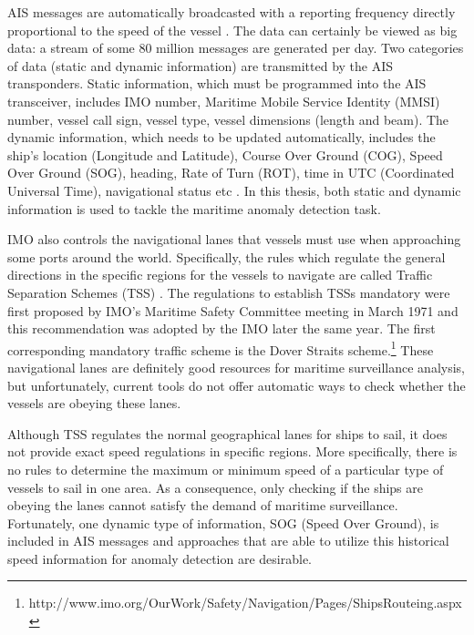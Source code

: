 \documentclass[12pt,glossary]{dalcsthesis}
\begin{document}
AIS messages are automatically broadcasted with a reporting frequency directly proportional to the speed of the vessel \cite{kde}.  The data can certainly be viewed as big data: a stream of some 80 million messages are generated per day. Two categories of data (static and dynamic information) are transmitted by the AIS transponders. Static information, which must be programmed into the AIS transceiver,  includes IMO number, Maritime Mobile Service Identity (MMSI) number, vessel call sign, vessel type, vessel dimensions (length and beam). The dynamic information, which needs to be updated automatically, includes the ship's location (Longitude and Latitude), Course Over Ground (COG), Speed Over Ground (SOG), heading, Rate of Turn (ROT), time in UTC (Coordinated Universal Time), navigational status etc \cite{IALA}. In this thesis, both static and dynamic information is used to tackle the maritime anomaly detection task.


IMO also controls the navigational lanes that vessels must use when approaching some ports around the world. Specifically, the rules which regulate the general directions in the specific regions for the vessels to navigate are called Traffic Separation Schemes (TSS) \cite{tss}.  The regulations to establish TSSs mandatory were first proposed by IMO's Maritime Safety Committee meeting in March 1971 and this recommendation was adopted by the IMO later the same year. The first corresponding mandatory traffic scheme is the Dover Straits scheme.\footnote{http://www.imo.org/OurWork/Safety/Navigation/Pages/ShipsRouteing.aspx} These navigational lanes are definitely good resources for maritime surveillance analysis, but unfortunately, current tools do not offer automatic ways to check whether the vessels are obeying these lanes. 

Although TSS regulates the normal geographical lanes for ships to sail, it does not provide exact speed regulations in specific regions. More specifically, there is no rules to determine the maximum or minimum speed of a particular type of vessels to sail in one area. As a consequence, only checking if the ships are obeying the lanes cannot satisfy the demand of maritime surveillance. Fortunately, one dynamic type of information, SOG (Speed Over Ground), is included in AIS messages and approaches that are able to utilize this historical speed information for anomaly detection are desirable.

\end{document}
